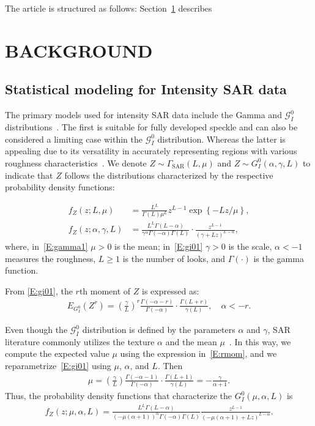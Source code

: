 \documentclass[conference]{IEEEtran}
\begin{document}
{The article is structured as follows: 
Section~\ref{sec_02} describes 

\section{BACKGROUND}\label{sec_02}

\subsection{Statistical modeling for Intensity SAR data}

The primary models used for intensity SAR data include the Gamma and $\mathcal{G}_I^0$  distributions~\cite{Frery1997}. 
The first is suitable for fully developed speckle and can also be considered a limiting case within the $\mathcal{G}_I^0$ distribution.
Whereas the latter is appealing due to its versatility in accurately representing regions with various roughness characteristics~\cite{Cassetti2022}.
We denote $Z \sim \Gamma_{\text{SAR}}(L, \mu)$ and $Z \sim G_I^0(\alpha, \gamma, L)$ to indicate that $Z$ follows the distributions characterized by the respective probability density functions:

\begin{align}
	f_Z(z;L, \mu)&=\frac{L^L}{\Gamma(L)\mu^L}z^{L-1}\exp\left\{-Lz/\mu\right\},\label{E:gamma1}\\
	f_Z(z; \alpha, \gamma, L)&=\frac{L^L\Gamma(L-\alpha)}{\gamma^{\alpha}\Gamma(-\alpha)\Gamma(L)}\cdot\frac{z^{L-1}}{(\gamma+Lz)^{L-\alpha}},\label{E:gi01}
\end{align}
where, in~\eqref{E:gamma1} $\mu > 0$ is the mean; in~\eqref{E:gi01}  $\gamma > 0$ is the scale, $\alpha < -1$ measures the roughness,  $L \geq 1$ is the number of looks, and $\Gamma(\cdot)$ is the gamma function.

From \eqref{E:gi01}, the $r$th moment of $Z$ is expressed as:
\begin{align}
	E_{G_I^0}\left(Z^r\right)=\left(\frac{\gamma}{L}\right)^r\frac{\Gamma(-\alpha-r)}{\Gamma(-\alpha)}\cdot\frac{\Gamma(L+r)}{\gamma(L)}, \quad \alpha <-r. 
	\label{E:rmom}
\end{align}
 
Even though the $\mathcal{G}_I^0$  distribution is defined by the parameters $\alpha$ and $\gamma$, SAR literature commonly utilizes the texture $\alpha$ and the mean $\mu$~\cite{Nascimento2010}.
In this way, we compute the expected value $\mu$ using the expression in~\eqref{E:rmom}, and we reparametrize~\eqref{E:gi01} using $\mu$, $\alpha$, and $L$. Then
\begin{align*}
	\mu=\left(\frac{\gamma}{L}\right)\frac{\Gamma(-\alpha-1)}{\Gamma(-\alpha)}\cdot\frac{\Gamma(L+1)}{\gamma(L)}=-\frac{\gamma}{\alpha+1}.
\end{align*}
Thus, the probability density functions that characterize the $G_I^0(\mu, \alpha, L)$ is
{\small %
\begin{align}
		f_Z(z; \mu, \alpha, L)=\frac{L^L\Gamma(L-\alpha)}{(-\mu(\alpha+1))^{\alpha}\Gamma(-\alpha)\Gamma(L)}\frac{z^{L-1}}{(-\mu(\alpha+1)+Lz)^{L-\alpha}}.\label{E:gi02}
\end{align}
}

}
\end{document}
